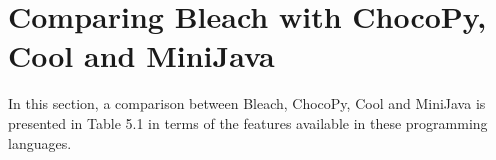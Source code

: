 \begin{comment}
  let queue = Queue();
  queue.push(source);

  while(!queue.empty()){
    let currNode = queue.pop();

    for(let i = 0; i < adjacencyList.getAt(currNode).size(); i = i + 1){
      let neighbor = adjacencyList.getAt(currNode).getAt(i);

      if(!visited.getAt(neighbor)){
        visited.setAt(neighbor, true);
        distance.setAt(neighbor, 1 + distance.getAt(currNode));
        queue.push(neighbor);
      }
    }
  }

  return;
}
        \end{lstlisting}
    \item Dijkstra's Shortest Path Algorithm
        \begin{lstlisting}
function dijkstraAlgorithm(source, adjacencyList, distance){
  let minHeap = MinBinaryHeap(); // Modified to receive lists of 2 elements.
  distance.setAt(source, 0);

  minHeap.push([0, source]);

  while(!minHeap.empty()){
    let currNodeInfo = minHeap.pop();
    let minPath = currNodeInfo.getAt(0);
    let currNode = currNodeInfo.getAt(1);

    for(let i = 0; i < adjacencyList.getAt(currNode).size(); i = i + 1){
      let neighbour = adjacencyList.getAt(currNode).getAt(i).getAt(0);
      let edge = adjacencyList.getAt(currNode).getAt(i).getAt(1);
      if(distance.getAt(currNode) + edge < distance.getAt(neighbour)){
        distance.setAt(neighbour, distance.getAt(currNode) + edge);
        minHeap.push([distance.getAt(neighbour), neighbour]);
      }
    }
  }

  return;
}
        \end{lstlisting}
\end{itemize}

\newpage

\end{comment}

\newpage

\section{Comparing Bleach with ChocoPy, Cool and MiniJava}
In this section, a comparison between Bleach, ChocoPy, Cool and MiniJava is presented in Table 5.1 in terms of the features available in these programming languages.


